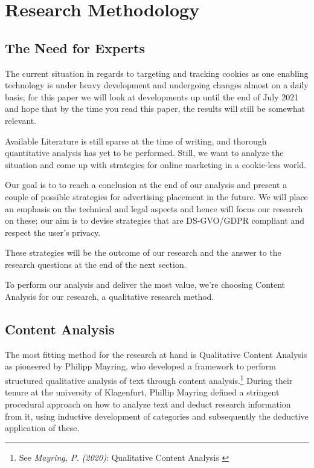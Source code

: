 %
%

\pagebreak
\section{Research Methodology}

\onehalfspacing

\subsection{The Need for Experts}

The current situation in regards to targeting and tracking cookies as one enabling technology is under heavy development and undergoing changes almost on a daily basis; for this paper we will look at developments up until the end of July 2021 and hope that by the time you read this paper, the results will still be somewhat relevant.

Available Literature is still sparse at the time of writing, and thorough quantitative analysis has yet to be performed. Still, we want to analyze the situation and come up with strategies for online marketing in a cookie-less world.

Our goal is to to reach a conclusion at the end of our analysis and present a couple of possible strategies for advertising placement in the future. We will place an emphasis on the technical and legal aspects and hence will focus our research on these; our aim is to devise strategies that are DS-GVO/GDPR compliant and respect the user's privacy.

These strategies will be the outcome of our research and the answer to the research questions at the end of the next section.

To perform our analysis and deliver the most value, we're choosing Content Analysis for our research, a qualitative research method.

\subsection{Content Analysis}

The most fitting method for the research at hand is Qualitative Content Analysis as pioneered by Philipp Mayring, who developed a framework to perform structured qualitative analysis of text through content analysis.\footnote{See \textit{Mayring, P. (2020)}: Qualitative Content Analysis \cite{qualiContent}} During their tenure at the university of Klagenfurt, Phillip Mayring defined a stringent procedural approach on how to analyze text and deduct research information from it, using inductive development of categories and subsequently the deductive application of these.

